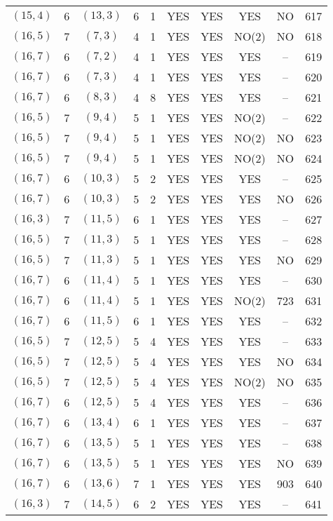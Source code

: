 \begin{longtable}{|c|c|c|c|c|c|c|c|c|c|}
$(15, 4)$ & 6 & $(13, 3)$ & 6 & 1 & YES & YES & YES & NO & 617\\
$(16, 5)$ & 7 & $(7, 3)$ & 4 & 1 & YES & YES & NO(2) & NO & 618\\
$(16, 7)$ & 6 & $(7, 2)$ & 4 & 1 & YES & YES & YES & -- & 619\\
$(16, 7)$ & 6 & $(7, 3)$ & 4 & 1 & YES & YES & YES & -- & 620\\
$(16, 7)$ & 6 & $(8, 3)$ & 4 & 8 & YES & YES & YES & -- & 621\\
$(16, 5)$ & 7 & $(9, 4)$ & 5 & 1 & YES & YES & NO(2) & -- & 622\\
$(16, 5)$ & 7 & $(9, 4)$ & 5 & 1 & YES & YES & NO(2) & NO & 623\\
$(16, 5)$ & 7 & $(9, 4)$ & 5 & 1 & YES & YES & NO(2) & NO & 624\\
$(16, 7)$ & 6 & $(10, 3)$ & 5 & 2 & YES & YES & YES & -- & 625\\
$(16, 7)$ & 6 & $(10, 3)$ & 5 & 2 & YES & YES & YES & NO & 626\\
$(16, 3)$ & 7 & $(11, 5)$ & 6 & 1 & YES & YES & YES & -- & 627\\
$(16, 5)$ & 7 & $(11, 3)$ & 5 & 1 & YES & YES & YES & -- & 628\\
$(16, 5)$ & 7 & $(11, 3)$ & 5 & 1 & YES & YES & YES & NO & 629\\
$(16, 7)$ & 6 & $(11, 4)$ & 5 & 1 & YES & YES & YES & -- & 630\\
$(16, 7)$ & 6 & $(11, 4)$ & 5 & 1 & YES & YES & NO(2) & 723 & 631\\
$(16, 7)$ & 6 & $(11, 5)$ & 6 & 1 & YES & YES & YES & -- & 632\\
$(16, 5)$ & 7 & $(12, 5)$ & 5 & 4 & YES & YES & YES & -- & 633\\
$(16, 5)$ & 7 & $(12, 5)$ & 5 & 4 & YES & YES & YES & NO & 634\\
$(16, 5)$ & 7 & $(12, 5)$ & 5 & 4 & YES & YES & NO(2) & NO & 635\\
$(16, 7)$ & 6 & $(12, 5)$ & 5 & 4 & YES & YES & YES & -- & 636\\
$(16, 7)$ & 6 & $(13, 4)$ & 6 & 1 & YES & YES & YES & -- & 637\\
$(16, 7)$ & 6 & $(13, 5)$ & 5 & 1 & YES & YES & YES & -- & 638\\
$(16, 7)$ & 6 & $(13, 5)$ & 5 & 1 & YES & YES & YES & NO & 639\\
$(16, 7)$ & 6 & $(13, 6)$ & 7 & 1 & YES & YES & YES & 903 & 640\\
$(16, 3)$ & 7 & $(14, 5)$ & 6 & 2 & YES & YES & YES & -- & 641\\

\end{longtable}
